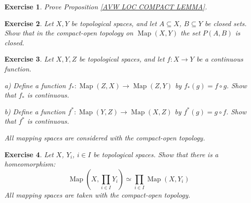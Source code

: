 \documentclass[11pt, letterpaper, oneside]{report}
\theoremstyle{pplain}
\newtheorem{ITERMVALUE THM}[theorem]{Intermediate Value Theorem}
\newtheorem{HEINEBOREL THM}[theorem]{Heine-Borel Theorem}
\newtheorem{UMETR THM}[theorem]{Urysohn Metrization Theorem}
\newtheorem{UMETR2 THM}[theorem]{Urysohn Metrization Theorem (v.2)}
\theoremstyle{ddefinition}
\theoremstyle{nnn}
\newtheorem{TDA NN}[theorem]{Topological Data Analysis. }
\theoremstyle{eexercise}
\newtheorem{exercise}{Exercise}[chapter]
\newcommand{\Map}{\operatorname{Map}}
\begin{document}
\begin{exercise}
Prove Proposition \ref{AVW LOC COMPACT LEMMA}. 
\end{exercise}




\begin{exercise}
Let $X, Y$ be topological spaces, and let $A\subseteq X$, $B\subseteq Y$ be closed sets. Show that in 
the compact-open topology on $\Map(X, Y)$ the set $P(A, B)$ is closed. 
\end{exercise}


\begin{exercise}
Let $X, Y, Z$ be topological spaces, and let $f\colon X \to Y$ be a continuous function. 

a) Define a function  $f_{\ast}\colon \Map(Z, X) \to \Map(Z, Y)$
by $f_{\ast}(g) = f\circ g$. Show that $f_{\ast}$ is continuous.

b) Define a function  $f^{\ast}\colon \Map(Y, Z) \to \Map(X, Z)$
by $f^{\ast}(g) = g\circ f$. Show that $f^{\ast}$ is continuous.

All mapping spaces are considered with the compact-open topology. 
\end{exercise}





\begin{exercise}
Let $X$, $Y_{i}$, $i\in I$ be topological spaces. Show that there is a homeomorphism: 
$$\textstyle{\Map(X, \prod_{i\in I} Y_{i}) \simeq \prod_{i\in I} \Map(X, Y_{i})}$$
All mapping spaces are taken with the compact-open topology. 
\end{exercise}



\end{document}
